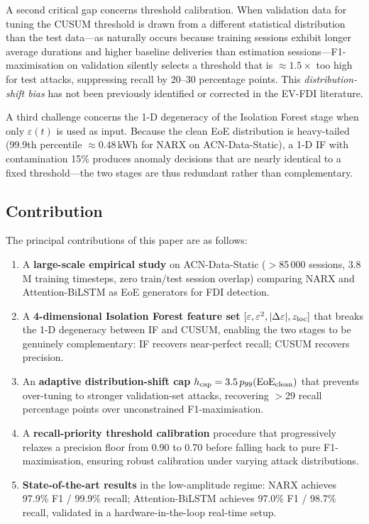\documentclass[journal]{IEEEtran}
\begin{document}
A second critical gap concerns threshold calibration.
When validation data for tuning the CUSUM threshold is drawn
from a different statistical distribution than the test data---as
naturally occurs because training sessions exhibit longer average
durations and higher baseline deliveries than estimation
sessions---F1-maximisation on validation silently selects a
threshold that is $\approx 1.5\times$ too high for test attacks,
suppressing recall by 20--30 percentage points.
This \emph{distribution-shift bias} has not been previously
identified or corrected in the EV-FDI literature.

A third challenge concerns the 1-D degeneracy of the Isolation
Forest stage when only $\varepsilon(t)$ is used as input.
Because the clean EoE distribution is heavy-tailed (99.9th
percentile $\approx 0.48$\,kWh for NARX on ACN-Data-Static),
a 1-D IF with contamination 15\% produces anomaly decisions
that are nearly identical to a fixed threshold---the two stages
are thus redundant rather than complementary.

\subsection{Contribution}

The principal contributions of this paper are as follows:
\begin{enumerate}
  \item A \textbf{large-scale empirical study} on ACN-Data-Static
        ($>$85\,000 sessions, 3.8\,M training timesteps, zero
        train/test session overlap) comparing NARX and
        Attention-BiLSTM as EoE generators for FDI detection.
  \item A \textbf{4-dimensional Isolation Forest feature set}
        $[\varepsilon,\varepsilon^2,|\Delta\varepsilon|,z_{\rm loc}]$
        that breaks the 1-D degeneracy between IF and CUSUM,
        enabling the two stages to be genuinely complementary:
        IF recovers near-perfect recall; CUSUM recovers precision.
  \item An \textbf{adaptive distribution-shift cap}
        $h_{\rm cap} = 3.5\,p_{99}(\text{EoE}_{\rm clean})$
        that prevents over-tuning to stronger validation-set
        attacks, recovering $>$29 recall percentage points over
        unconstrained F1-maximisation.
  \item A \textbf{recall-priority threshold calibration} procedure
        that progressively relaxes a precision floor from 0.90 to
        0.70 before falling back to pure F1-maximisation, ensuring
        robust calibration under varying attack distributions.
  \item \textbf{State-of-the-art results} in the low-amplitude
        regime: NARX achieves 97.9\% F1 / 99.9\% recall;
        Attention-BiLSTM achieves 97.0\% F1 / 98.7\% recall,
        validated in a hardware-in-the-loop real-time setup.
\end{enumerate}
\end{document}
